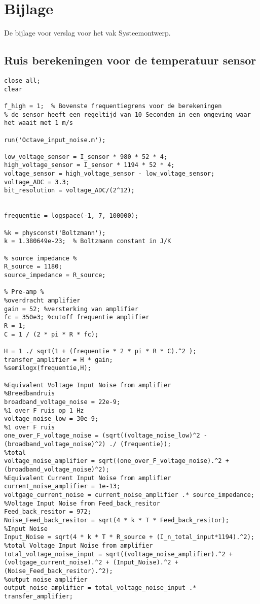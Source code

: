 \newpage
\section{Bijlage}
De bijlage voor verslag voor het vak Systeemontwerp.

\subsection{Ruis berekeningen voor de temperatuur sensor}
\begin{lstlisting}[caption={Octave code voor de ruis berekeningen van de temperatuur sensor}, label={lst:octave_code_noise}]
close all;
clear

f_high = 1;  % Bovenste frequentiegrens voor de berekeningen
% de sensor heeft een regeltijd van 10 Seconden in een omgeving waar het waait met 1 m/s

run('Octave_input_noise.m');

low_voltage_sensor = I_sensor * 980 * 52 * 4;
high_voltage_sensor = I_sensor * 1194 * 52 * 4;
voltage_sensor = high_voltage_sensor - low_voltage_sensor;
voltage_ADC = 3.3;
bit_resolution = voltage_ADC/(2^12);


frequentie = logspace(-1, 7, 100000);

%k = physconst('Boltzmann');
k = 1.380649e-23;  % Boltzmann constant in J/K

% source impedance %
R_source = 1180;
source_impedance = R_source;

% Pre-amp %
%overdracht amplifier
gain = 52; %versterking van amplifier
fc = 350e3; %cutoff frequentie amplifier
R = 1;
C = 1 / (2 * pi * R * fc);

H = 1 ./ sqrt(1 + (frequentie * 2 * pi * R * C).^2 );
transfer_amplifier = H * gain;
%semilogx(frequentie,H);

%Equivalent Voltage Input Noise from amplifier
%Breedbandruis
broadband_voltage_noise = 22e-9;
%1 over F ruis op 1 Hz
voltage_noise_low = 30e-9;
%1 over F ruis
one_over_F_voltage_noise = (sqrt((voltage_noise_low)^2 - (broadband_voltage_noise)^2) ./ (frequentie));
%total
voltage_noise_amplifier = sqrt((one_over_F_voltage_noise).^2 + (broadband_voltage_noise)^2);
%Equivalent Current Input Noise from amplifier
current_noise_amplifier = 1e-13;
voltgage_current_noise = current_noise_amplifier .* source_impedance;
%Voltage Input Noise from Feed_back_resitor
Feed_back_resitor = 972;
Noise_Feed_back_resitor = sqrt(4 * k * T * Feed_back_resitor);
%Input Noise
Input_Noise = sqrt(4 * k * T * R_source + (I_n_total_input*1194).^2);
%total Voltage Input Noise from amplifier
total_voltage_noise_input = sqrt((voltage_noise_amplifier).^2 + (voltgage_current_noise).^2 + (Input_Noise).^2 + (Noise_Feed_back_resitor).^2);
%output noise amplifier
output_noise_amplifier = total_voltage_noise_input .* transfer_amplifier;


\end{lstlisting}
